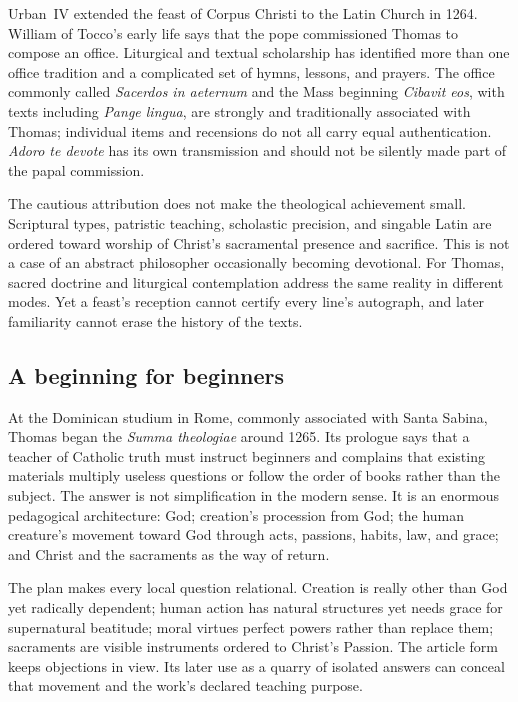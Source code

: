 Urban~IV extended the feast of Corpus Christi to the Latin Church in 1264.
William of Tocco's early life says that the pope commissioned Thomas to compose
an office.  Liturgical and textual scholarship has identified more than one
office tradition and a complicated set of hymns, lessons, and prayers.  The
office commonly called \emph{Sacerdos in aeternum} and the Mass beginning
\emph{Cibavit eos}, with texts including \emph{Pange lingua}, are strongly and
traditionally associated with Thomas; individual items and recensions do not
all carry equal authentication.  \emph{Adoro te devote} has its own transmission
and should not be silently made part of the papal commission.

The cautious attribution does not make the theological achievement small.
Scriptural types, patristic teaching, scholastic precision, and singable Latin
are ordered toward worship of Christ's sacramental presence and sacrifice.
This is not a case of an abstract philosopher occasionally becoming devotional.
For Thomas, sacred doctrine and liturgical contemplation address the same
reality in different modes.  Yet a feast's reception cannot certify every
line's autograph, and later familiarity cannot erase the history of the texts.

\subsection{A beginning for beginners}

At the Dominican studium in Rome, commonly associated with Santa Sabina,
Thomas began the \emph{Summa theologiae} around 1265.  Its prologue says that a
teacher of Catholic truth must instruct beginners and complains that existing
materials multiply useless questions or follow the order of books rather than
the subject.  The answer is not simplification in the modern sense.  It is an
enormous pedagogical architecture: God; creation's procession from God; the
human creature's movement toward God through acts, passions, habits, law, and
grace; and Christ and the sacraments as the way of return.

The plan makes every local question relational.  Creation is really other than
God yet radically dependent; human action has natural structures yet needs
grace for supernatural beatitude; moral virtues perfect powers rather than
replace them; sacraments are visible instruments ordered to Christ's Passion.
The article form keeps objections in view.  Its later use as a quarry of
isolated answers can conceal that movement and the work's declared teaching
purpose.

